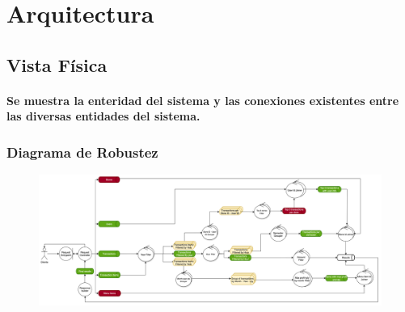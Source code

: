 \documentclass[titlepage,a4paper]{article}
\begin{document}
\section{Arquitectura}\label{sec:arquitectura}

\subsection{Vista Física}
\paragraph{Se muestra la enteridad del sistema y las conexiones existentes entre las diversas entidades del sistema.}

\subsubsection{Diagrama de Robustez}
\begin{figure}[H]
	\centering
	\includegraphics[width=1.4\textwidth, angle=90]{robustez.png}
\end{figure}
\end{document}

